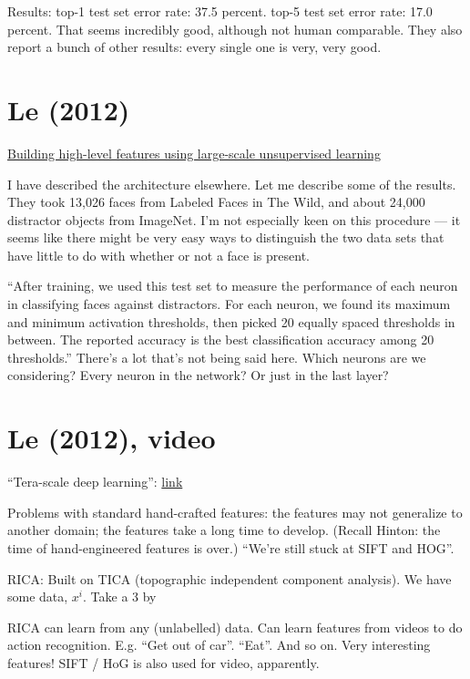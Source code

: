 \documentclass[12pt]{report}
\newcommand{\link}[2]{\href{#1}{#2}}
\begin{document}
Results: top-1 test set error rate: 37.5 percent.  top-5 test set
error rate: 17.0 percent.  That seems incredibly good, although not
human comparable.  They also report a bunch of other results: every
single one is very, very good.

\section{Le (2012)}

\link{http://ai.stanford.edu/\~ang/papers/icml12-HighLevelFeaturesUsingUnsupervisedLearning.pdf}{Building
  high-level features using large-scale unsupervised learning}

I have described the architecture elsewhere.  Let me describe some of
the results.  They took 13,026 faces from Labeled Faces in The Wild,
and about 24,000 distractor objects from ImageNet.  I'm not especially
keen on this procedure --- it seems like there might be very easy ways
to distinguish the two data sets that have little to do with whether
or not a face is present.

``After training, we used this test set to measure the performance of
each neuron in classifying faces against distractors.  For each
neuron, we found its maximum and minimum activation thresholds, then
picked 20 equally spaced thresholds in between.  The reported accuracy
is the best classification accuracy among 20 thresholds.''  There's a
lot that's not being said here.  Which neurons are we considering?
Every neuron in the network?  Or just in the last layer?

\section{Le (2012), video}

``Tera-scale deep learning'': \link{http://vimeo.com/52332329}{link}

Problems with standard hand-crafted features: the features may not
generalize to another domain; the features take a long time to
develop.  (Recall Hinton: the time of hand-engineered features is
over.)  ``We're still stuck at SIFT and HOG''.  

RICA: Built on TICA (topographic independent component analysis).  We
have some data, $x^i$.  Take a 3 by 

RICA can learn from any (unlabelled) data.  Can learn features from
videos to do action recognition.  E.g. ``Get out of car''.  ``Eat''.
And so on.  Very interesting features!  SIFT / HoG is also used for
video, apparently.
\end{document}
